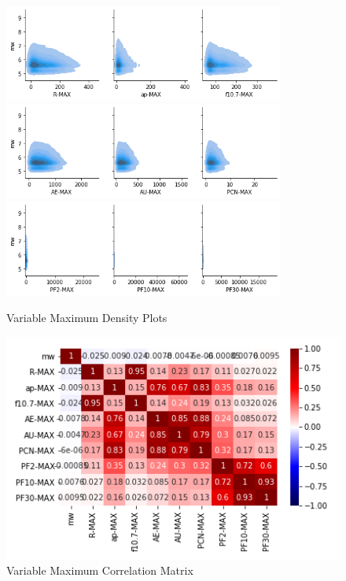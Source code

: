 \documentclass[12pt]{article}
\begin{document}
\begin{figure}
\centering
   \includegraphics[width=0.82\textwidth]{max_kdeplot_1.png}
   \includegraphics[width=0.82\textwidth]{max_kdeplot_2.png}
   \includegraphics[width=0.82\textwidth]{max_kdeplot_3.png}
   \caption{Variable Maximum Density Plots}

   \includegraphics{max_heatmap.png}
   \caption{Variable Maximum Correlation Matrix}
\end{figure}

\newpage
\end{document}
